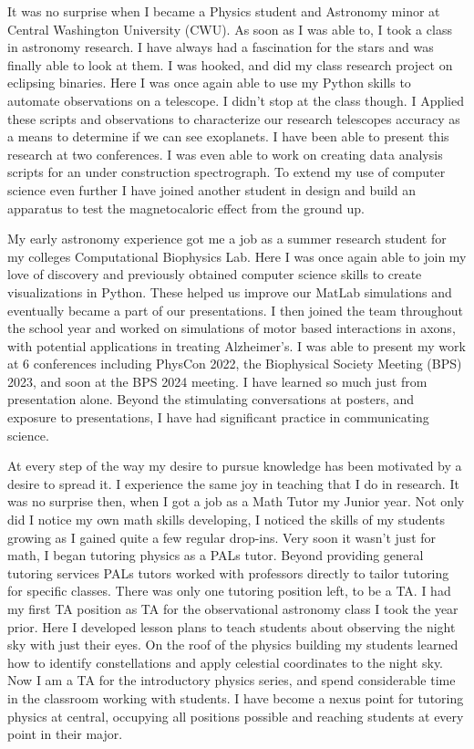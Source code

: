 \documentclass[a4paper, 12pt]{article}
\begin{document}
It was no surprise when I became a Physics student and Astronomy minor at Central Washington University (CWU). As soon as I was able to, I took a class in astronomy research. I have always had a fascination for the stars and was finally able to look at them. I was hooked, and did my class research project on eclipsing binaries. Here I was once again able to use my Python skills to automate observations on a telescope. I didn't stop at the class though. I Applied these scripts and observations to characterize our research telescopes accuracy as a means to determine if we can see exoplanets. I have been able to present this research at two conferences. I was even able to work on creating data analysis scripts for an under construction spectrograph. To extend my use of computer science even further I have joined another student in design and build an apparatus to test the magnetocaloric effect from the ground up.

My early astronomy experience got me a job as a summer research student for my colleges Computational Biophysics Lab. Here I was once again able to join my love of discovery and previously obtained computer science skills to create visualizations in Python. These helped us improve our MatLab simulations and eventually became a part of our presentations. I then joined the team throughout the school year and worked on simulations of motor based interactions in axons, with potential applications in treating Alzheimer's. I was able to present my work at 6 conferences including PhysCon 2022, the Biophysical Society Meeting (BPS) 2023, and soon at the BPS 2024 meeting. I have learned so much just from presentation alone. Beyond the stimulating conversations at posters, and exposure to presentations, I have had significant practice in communicating science.

At every step of the way my desire to pursue knowledge has been motivated by a desire to spread it. I experience the same joy in teaching that I do in research. It was no surprise then, when I got a job as a Math Tutor my Junior year. Not only did I notice my own math skills developing, I noticed the skills of my students growing as I gained quite a few regular drop-ins. Very soon it wasn't just for math, I began tutoring physics as a PALs tutor. Beyond providing general tutoring services PALs tutors worked with professors directly to tailor tutoring for specific classes. There was only one tutoring position left, to be a TA. I had my first TA position as TA for the observational astronomy class I took the year prior. Here I developed lesson plans to teach students about observing the night sky with just their eyes. On the roof of the physics building my students learned how to identify constellations and apply celestial coordinates to the night sky. Now I am a TA for the introductory physics series, and spend considerable time in the classroom working with students. I have become a nexus point for tutoring physics at central, occupying all positions possible and reaching students at every point in their major.
\end{document}
